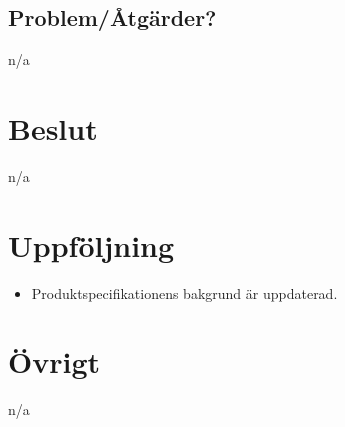 \subsection*{Problem/Åtgärder?}
n/a

\section*{Beslut}
n/a

\section*{Uppföljning}
\begin{itemize}
    \item Produktspecifikationens bakgrund är uppdaterad.
\end{itemize}

\section*{Övrigt}
n/a